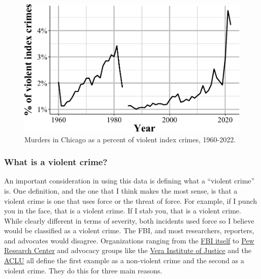 \documentclass[
  12pt,
  openany]{book}
\begin{document}
\begin{figure}

{\centering \includegraphics[width=0.9\linewidth]{03_offenses_known_files/figure-latex/chicagoMurder-1} 

}

\caption{Murders in Chicago as a percent of violent index crimes, 1960-2022.}\label{fig:chicagoMurder}
\end{figure}

\subsubsection{What is a violent crime?}\label{what-is-a-violent-crime}

An important consideration in using this data is defining what a ``violent crime'' is. One definition, and the one that I think makes the most sense, is that a violent crime is one that uses force or the threat of force. For example, if I punch you in the face, that is a violent crime. If I stab you, that is a violent crime. While clearly different in terms of severity, both incidents used force so I believe would be classified as a violent crime. The FBI, and most researchers, reporters, and advocates would disagree. Organizations ranging from the \href{https://SRS.fbi.gov/crime-in-the-u.s/2019/crime-in-the-u.s.-2019/topic-pages/violent-crime}{FBI itself} to \href{https://www.pewresearch.org/fact-tank/2020/11/20/facts-about-crime-in-the-u-s/}{Pew Research Center} and advocacy groups like the \href{https://arresttrends.vera.org/data-sources-methodology}{Vera Institute of Justice} and the \href{https://www.aclu.org/report/tale-two-countries-racially-targeted-arrests-era-marijuana-reform}{ACLU} all define the first example as a non-violent crime and the second as a violent crime. They do this for three main reasons.
\end{document}
